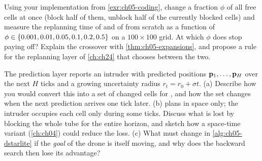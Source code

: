 \begin{exercise}
\label{exr:ch05-threshold}
Using your implementation from \cref{exr:ch05-coding}, change a fraction $\phi$ of all
free cells at once (block half of them, unblock half of the currently blocked cells) and
measure the replanning time of \dstarlite and of \astar from scratch as a function of
$\phi \in \left\{ 0.001, 0.01, 0.05, 0.1, 0.2, 0.5 \right\}$ on a $100\times 100$ grid. At which
$\phi$ does \dstarlite stop paying off? Explain the crossover with
\cref{thm:ch05-expansions}, and propose a rule for the replanning layer of
\cref{ch:ch24} that chooses between the two.
\end{exercise}

\begin{exercise}[\difficulty{2}]
\label{exr:ch05-intruder}
The prediction layer reports an intruder with predicted positions
$\mathbf{p}_1,\dots,\mathbf{p}_H$ over the next $H$ ticks and a growing uncertainty radius
$r_t = r_0 + \sigma t$. (a) Describe how you would convert this into a set of changed
cells for \dstarlite, and how the set changes when the next prediction arrives one tick
later. (b) \dstarlite plans in space only; the intruder occupies each cell only during
some ticks. Discuss what is lost by blocking the whole tube for the entire horizon, and
sketch how a space-time variant (\cref{ch:ch04}) could reduce the loss. (c) What must
change in \cref{alg:ch05-dstarlite} if the \emph{goal} of the drone is itself moving,
and why does the backward search then lose its advantage?
\end{exercise}
